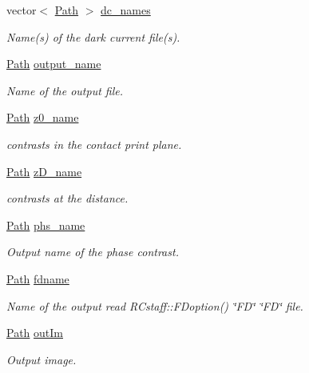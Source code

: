 \begin{DoxyCompactItemize}
vector$<$ \hyperlink{classPath}{Path} $>$ \hyperlink{structclargs_ab36a2f3b791e04772d842cb85013089a}{dc\_\-names}
\begin{DoxyCompactList}\small\item\em Name(s) of the dark current file(s). \item\end{DoxyCompactList}\item 
\hyperlink{classPath}{Path} \hyperlink{structclargs_a3024e9ff1fd5eaaa6eb32c8dde23f34e}{output\_\-name}
\begin{DoxyCompactList}\small\item\em Name of the output file. \item\end{DoxyCompactList}\item 
\hyperlink{classPath}{Path} \hyperlink{structclargs_a529a1ba833bfd7f322089ee7e1de57ec}{z0\_\-name}
\begin{DoxyCompactList}\small\item\em contrasts in the contact print plane. \item\end{DoxyCompactList}\item 
\hyperlink{classPath}{Path} \hyperlink{structclargs_affa0f7980f981b4a5067b2333060bea8}{zD\_\-name}
\begin{DoxyCompactList}\small\item\em contrasts at the distance. \item\end{DoxyCompactList}\item 
\hyperlink{classPath}{Path} \hyperlink{structclargs_aa1aa24a8a3a78b10dd5be6aba22c2ae2}{phs\_\-name}
\begin{DoxyCompactList}\small\item\em Output name of the phase contrast. \item\end{DoxyCompactList}\item 
\hyperlink{classPath}{Path} \hyperlink{structclargs_a5bc2c64513cf2c0db294f527f4ecd8c1}{fdname}
\begin{DoxyCompactList}\small\item\em Name of the output read RCstaff::FDoption() \char`\"{}FD\char`\"{} \char`\"{}FD\char`\"{} file. \item\end{DoxyCompactList}\item 
\hyperlink{classPath}{Path} \hyperlink{structclargs_abe2f0cbfdf80f354fa43ba101ae37384}{outIm}
\begin{DoxyCompactList}\small\item\em Output image. \item\end{DoxyCompactList}\item 

\end{DoxyCompactItemize}
